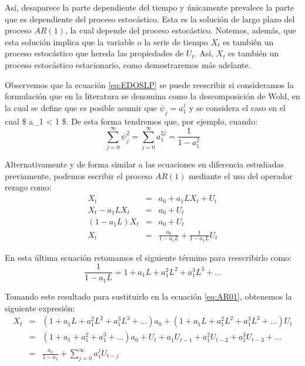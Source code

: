 \documentclass[
]{book}
\begin{document}
Así, desaparece la parte dependiente del tiempo y únicamente prevalece la parte que es dependiente del proceso estocástico. Esta es la solución de largo plazo del proceso \(AR(1)\), la cual depende del proceso estocástico. Notemos, además, que esta solución implica que la variable o la serie de tiempo \(X_t\) es también un proceso estocástico que hereda las propiedades de \(U_t\). Así, \(X_t\) es también un proceso estocástico estacionario, como demostraremos más adelante.

Observemos que la ecuación \eqref{eq:EDOSLP} se puede reescribir si consideramos la formulación que en la literatura se denomina como la descomposición de Wold, en la cual se define que es posible asumir que \(\psi_j = a_1^j\) y se considera el caso en el cual \$ \textbar a\_1\textbar{} \textless{} 1 \$. De esta forma tendremos que, por ejemplo, cuando:
\begin{equation*}
    \sum^{\infty}_{j = 0} \psi^2_j = \sum^{\infty}_{j = 0} a_1^{2j} = \frac{1}{1 - a_1^2} 
\end{equation*}

Alternativamente y de forma similar a las ecuaciones en diferencia estudiadas previamente, podemos escribir el proceso \(AR(1)\) mediante el uso del operador rezago como:
\begin{eqnarray}
    X_t & = & a_0 + a_1 L X_t + U_t \nonumber \\
    X_t - a_1 L X_t & = & a_0 + U_t \nonumber \\
    (1 - a_1 L) X_t & = & a_0 + U_t \nonumber \\
    X_t & = & \frac{a_0}{1 - a_1 L} + \frac{1}{1 - a_1 L} U_t
    \label{eq:AR01}
\end{eqnarray}

En esta última ecuación retomamos el siguiente término para reescribirlo como:
\begin{equation}
    \frac{1}{1 - a_1 L} = 1 + a_1 L + a_1^2 L^2 + a_1^3 L^3 + \ldots 
\end{equation}

Tomando este resultado para sustituirlo en la ecuación \eqref{eq:AR01}, obtenemos la siguiente expresión:
\begin{eqnarray}
    X_t & = & (1 + a_1 L + a_1^2 L^2 + a_1^3 L^3 + \ldots) a_0 + (1 + a_1 L + a_1^2 L^2 + a_1^3 L^3 + \ldots) U_t \nonumber \\
    & = & (1 + a_1 + a_1^2 + a_1^3 + \ldots) a_0 + U_t + a_1 U_{t-1} + a_1^2 U_{t-2} + a_1^3 U_{t-3} + \ldots \nonumber \\
    & = & \frac{a_0}{1 - a_1} + \sum^{\infty}_{j = 0} a_1^j U_{t-j}
    \label{eq:AR1Sol}
\end{eqnarray}
\end{document}
